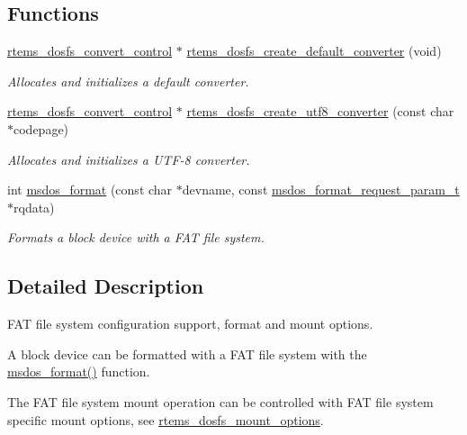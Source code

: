 \subsection*{Functions}
\begin{DoxyCompactItemize}
\item 
\mbox{\hyperlink{structrtems__dosfs__convert__control}{rtems\+\_\+dosfs\+\_\+convert\+\_\+control}} $\ast$ \mbox{\hyperlink{group__DOSFS_ga9dc28ad698d4946c7bf691fa0b0a6c78}{rtems\+\_\+dosfs\+\_\+create\+\_\+default\+\_\+converter}} (void)
\begin{DoxyCompactList}\small\item\em Allocates and initializes a default converter. \end{DoxyCompactList}\item 
\mbox{\hyperlink{structrtems__dosfs__convert__control}{rtems\+\_\+dosfs\+\_\+convert\+\_\+control}} $\ast$ \mbox{\hyperlink{group__DOSFS_ga47cec61b81f7868a5b821709246a8509}{rtems\+\_\+dosfs\+\_\+create\+\_\+utf8\+\_\+converter}} (const char $\ast$codepage)
\begin{DoxyCompactList}\small\item\em Allocates and initializes a U\+T\+F-\/8 converter. \end{DoxyCompactList}\item 
int \mbox{\hyperlink{group__DOSFS_ga89cdc98023478833b6291f2e3cea56f2}{msdos\+\_\+format}} (const char $\ast$devname, const \mbox{\hyperlink{structmsdos__format__request__param__t}{msdos\+\_\+format\+\_\+request\+\_\+param\+\_\+t}} $\ast$rqdata)
\begin{DoxyCompactList}\small\item\em Formats a block device with a F\+AT file system. \end{DoxyCompactList}\end{DoxyCompactItemize}


\subsection{Detailed Description}
F\+AT file system configuration support, format and mount options. 

A block device can be formatted with a F\+AT file system with the \mbox{\hyperlink{group__DOSFS_ga89cdc98023478833b6291f2e3cea56f2}{msdos\+\_\+format()}} function.

The F\+AT file system mount operation can be controlled with F\+AT file system specific mount options, see \mbox{\hyperlink{structrtems__dosfs__mount__options}{rtems\+\_\+dosfs\+\_\+mount\+\_\+options}}. 

